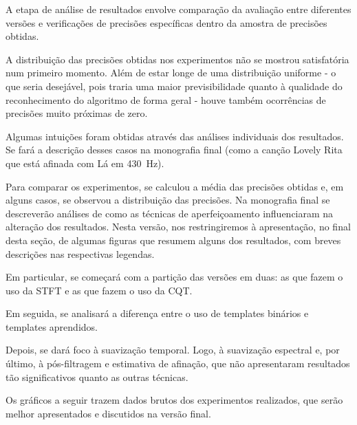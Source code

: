     A etapa de análise de resultados envolve comparação da avaliação entre diferentes versões e verificações de precisões específicas dentro da amostra de precisões obtidas.
    
    A distribuição das precisões obtidas nos experimentos não se mostrou satisfatória num primeiro momento. Além de estar longe de uma distribuição uniforme - o que seria desejável, pois traria uma maior previsibilidade quanto à qualidade do reconhecimento do algoritmo de forma geral - houve também ocorrências de precisões muito próximas de zero.
    
    Algumas intuições foram obtidas através das análises individuais dos resultados. Se fará a descrição desses casos na monografia final (como a canção Lovely Rita que está afinada com Lá em 430~Hz).
    
    Para comparar os experimentos, se calculou a média das precisões obtidas e, em alguns casos, se observou a distribuição das precisões. Na monografia final se descreverão análises de como as técnicas de aperfeiçoamento influenciaram na alteração dos resultados. Nesta versão, nos restringiremos à apresentação, no final desta seção, de algumas figuras que resumem alguns dos resultados, com breves descrições nas respectivas legendas.
    
    Em particular, se começará com a partição das versões em duas: as que fazem o uso da STFT e as que fazem o uso da CQT.
    
    Em seguida, se analisará a diferença entre o uso de templates binários e templates aprendidos.
    
    Depois, se dará foco à suavização temporal. Logo, à suavização espectral e, por último, à pós-filtragem e estimativa de afinação, que não apresentaram resultados tão significativos quanto as outras técnicas.

    Os gráficos a seguir trazem dados brutos dos experimentos realizados, que serão melhor apresentados e discutidos na versão final.


